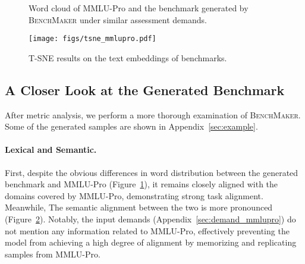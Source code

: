\begin{figure}[!htb]
    \centering
    \vspace{-3mm}
    \caption{Word cloud of MMLU-Pro and the benchmark generated by \textsc{BenchMaker} under similar assessment demands.}
    \label{fig:word}
\end{figure}

\begin{figure}[h]
\centering
\texttt{[image: figs/tsne\_mmlupro.pdf]}
\caption{T-SNE results on the text embeddings of benchmarks.}
\label{fig:tsne}
\end{figure}

\subsection{A Closer Look at the Generated Benchmark}
After metric analysis, we perform a more thorough examination of \textsc{BenchMaker}. 
Some of the generated samples are shown in Appendix~\ref{sec:example}.
\paragraph{Lexical and Semantic.}
First, despite the obvious differences in word distribution between the generated benchmark and MMLU-Pro (Figure~\ref{fig:word}), it remains closely aligned with the domains covered by MMLU-Pro, demonstrating strong task alignment.
Meanwhile, 
The semantic alignment between the two is more pronounced (Figure~\ref{fig:tsne}). Notably, the input demands (Appendix~\ref{sec:demand_mmlupro}) do not mention any information related to MMLU-Pro, effectively preventing the model from achieving a high degree of alignment by memorizing and replicating samples from MMLU-Pro.
